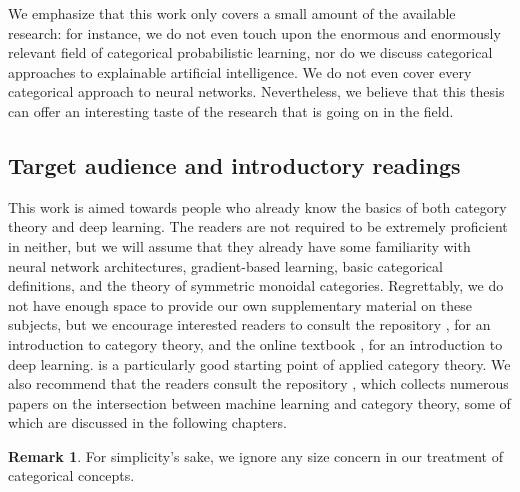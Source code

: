 \documentclass[11pt,a4paper,openright,twoside]{report}
\newcounter{mycounter}
\theoremstyle{plain}
\theoremstyle{definition}
\newtheorem{remark}[mycounter]{Remark}
\begin{document}
We emphasize that this work only covers a small amount of the available research: for instance, we do not even touch upon the enormous and enormously relevant field of categorical probabilistic learning, nor do we discuss categorical approaches to explainable artificial intelligence. We do not even cover every categorical approach to neural networks. Nevertheless, we believe that this thesis can offer an interesting taste of the research that is going on in the field.

\subsection*{Target audience and introductory readings}

This work is aimed towards people who already know the basics of both category theory and deep learning. The readers are not required to be extremely proficient in neither, but we will assume that they already have some familiarity with neural network architectures, gradient-based learning, basic categorical definitions, and the theory of symmetric monoidal categories. Regrettably, we do not have enough space to provide our own supplementary material on these subjects, but we encourage interested readers to consult the repository \cite{gavranovic2023category}, for an introduction to category theory, and the online textbook \cite{zhang2021dive}, for an introduction to deep learning. \cite{fong2018seven} is a particularly good starting point of applied category theory. We also recommend that the readers consult the repository \cite{gavranovic2023intersection}, which collects numerous papers on the intersection between machine learning and category theory, some of which are discussed in the following chapters.

\begin{remark}
  For simplicity's sake, we ignore any size concern in our treatment of categorical concepts.
\end{remark}

\clearpage{\pagestyle{empty}\cleardoublepage}



\tableofcontents
\rhead[\fancyplain{}{\bfseries\leftmark}]{\fancyplain{}{\bfseries\thepage}} 
\clearpage{\pagestyle{empty}\cleardoublepage}



\listoffigures  
\rhead[\fancyplain{}{\bfseries\leftmark}]{\fancyplain{}{\bfseries\thepage}} 
\clearpage{\pagestyle{empty}\cleardoublepage}
\end{document}
